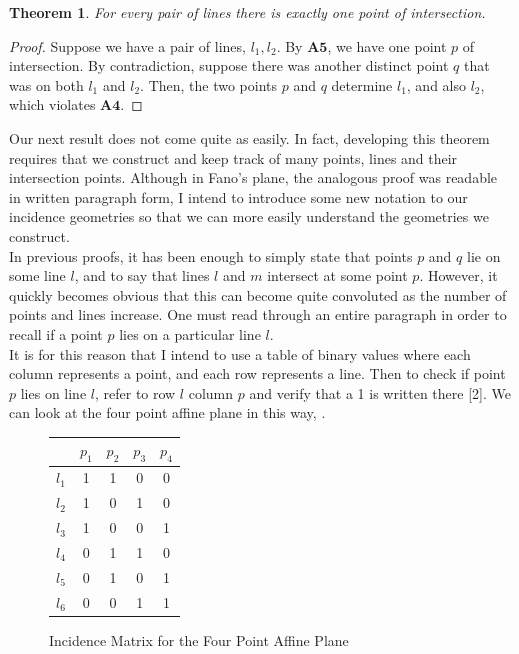 \documentclass{article}
\newtheorem{theorem}{Theorem}[section]
\begin{document}
\begin{theorem}
For every pair of lines there is exactly one point of intersection.
\end{theorem}

\begin{proof}
Suppose we have a pair of lines, $l_1, l_2$. By $\mathbf{A5}$, we have one point $p$ of intersection. By contradiction, suppose there was another distinct point $q$ that was on both $l_1$ and $l_2$. Then, the two points $p$ and $q$ determine $l_1$, and also $l_2$, which violates $\mathbf{A4}$.
\end{proof}

Our next result does not come quite as easily. In fact, developing this theorem requires that we construct and keep track of many points, lines and their intersection points. Although in Fano's plane, the analogous proof was readable in written paragraph form, I intend to introduce some new notation to our incidence geometries so that we can more easily understand the geometries we construct. \\

In previous proofs, it has been enough to simply state that points $p$ and $q$ lie on some line $l$, and to say that lines $l$ and $m$ intersect at some point $p$. However, it quickly becomes obvious that this can become quite convoluted as the number of points and lines increase. One must read through an entire paragraph in order to recall if a point $p$ lies on a particular line $l$. \\

It is for this reason that I intend to use a table of binary values where each column represents a point, and each row represents a line. Then to check if point $p$ lies on line $l$, refer to row $l$ column $p$ and verify that a 1 is written there [2]. We can look at the four point affine plane in this way, .
\begin{figure}[h]
\caption{Incidence Matrix for the Four Point Affine Plane}
\begin{center}
\begin{tabular}{ c|c|c|c|c } 
 
  & $p_1$ & $p_2$ & $p_3$ &$p_4$\\ 
\hline
 $l_1$ & 1 & 1 & 0 & 0\\
 \hline
 $l_2$ & 1 & 0 & 1 & 0\\
 \hline
 $l_3$ & 1 & 0 & 0 & 1\\
 \hline
 $l_4$ & 0 & 1 & 1 & 0\\
  \hline
 $l_5$ & 0 & 1 & 0 & 1\\
 \hline
 $l_6$ & 0 & 0 & 1 & 1\\
\end{tabular}
\end{center}
\end{figure}
\end{document}

